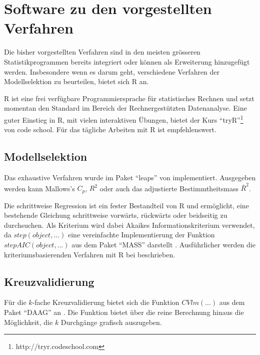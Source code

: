 \section{Software zu den vorgestellten Verfahren}
Die bisher vorgestellten Verfahren sind in den meisten grösseren Statistikprogrammen bereits integriert oder können als Erweiterung hinzugefügt werden.
Insbesondere wenn es darum geht, verschiedene Verfahren der Modellselektion zu beurteilen, bietet sich R an.

R ist eine frei verfügbare Programmiersprache für statistisches Rechnen \cite{R:core} und setzt momentan den Standard im Bereich der Rechnergestützten Datenanalyse. 
Eine guter Einstieg in R, mit vielen interaktiven Übungen, bietet der Kurs ``tryR''\footnote{http://tryr.codeschool.com} von code school.
Für das tägliche Arbeiten mit R ist   empfehlenswert.

\subsection{Modellselektion}
Das exhaustive Verfahren wurde im Paket ``leaps'' von  implementiert. 
Ausgegeben werden kann Mallows's $C_p$, $R^2$ oder auch das adjustierte Bestimmtheitsmass $\bar R^2$.

Die schrittweise Regression ist ein fester Bestandteil von R  und ermöglicht, eine bestehende Gleichung schrittweise vorwärts, rückwärts oder beidseitig zu durchsuchen.
Als Kriterium wird dabei Akaikes Informationskriterium verwendet, da $step(object, ...)$ eine vereinfachte Implementierung der Funktion $stepAIC(object, ...)$  aus dem Paket ``MASS'' darstellt \cite{R:MASS}. 
Ausführlicher werden die kriteriumsbasierenden Verfahren mit R bei  beschrieben.

\subsection{Kreuzvalidierung}
Für die $k$-fache Kreuzvalidierung bietet sich die Funktion $CVlm(...)$ aus dem Paket ``DAAG'' an \cite{R:DAAG}. 
Die Funktion bietet über die reine Berechnung hinaus die Möglichkeit, die $k$ Durchgänge grafisch auszugeben.

